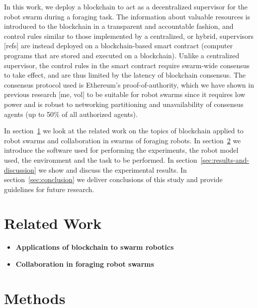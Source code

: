 \documentclass[runningheads]{llncs}
\newcommand{\blue}[1]{\textcolor{blue}{#1}}
\newcommand{\poa}{proof-of-authority\xspace}
\begin{document}
 
 In this work, we deploy a blockchain to act as a decentralized supervisor for the robot swarm during a foraging task. The information about valuable resources is introduced to the blockchain in a transparent and accountable fashion, and control rules similar to those implemented by a centralized, or hybrid, supervisors [refs] are instead deployed on a blockchain-based smart contract (computer programs that are stored and executed on a blockchain). Unlike a centralized supervisor, the control rules in the smart contract require swarm-wide consensus to take effect, and are thus limited by the latency of blockchain consensus. The consensus protocol used is Ethereum's \poa, which we have shown in previous research [me, vol] to be suitable for robot swarms since it requires low power and is robust to networking partitioning and unavailability of consensus agents (up to 50\% of all authorized agents).
 
 In section~\ref{sec:related-work} we look at the related work on the topics of blockchain applied to robot swarms and collaboration in swarms of foraging robots. In section~\ref{sec:methods} we introduce the software used for performing the experiments, the robot model used, the environment and the task to be performed. In section~\ref{sec:results-and-discussion} we show and discuss the experimental results. In section~\ref{sec:conclusion} we deliver conclusions of this study and provide guidelines for future research.

\section{Related Work}
\label{sec:related-work}

\begin{itemize}
\item \textbf{Applications of blockchain to swarm robotics}
\item \textbf{Collaboration in foraging robot swarms}
\end{itemize}

\blue{\lipsum[1-5]}

\section{Methods}
\label{sec:methods}
\end{document}

